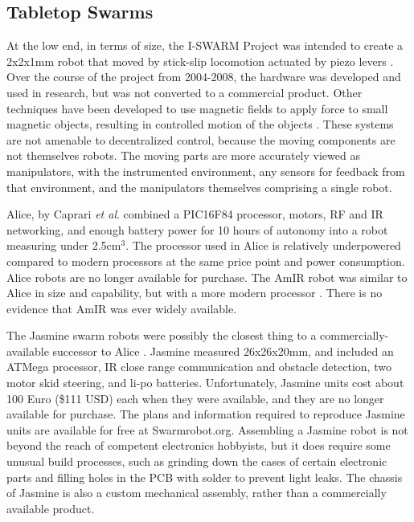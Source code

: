 \subsection{Tabletop Swarms}

At the low end, in terms of size, the I-SWARM Project was intended to create a 2x2x1mm robot that moved by stick-slip locomotion actuated by piezo levers \citep{seyfried2005swarm}. 
Over the course of the project from 2004-2008, the hardware was developed and used in research, but was not converted to a commercial product.
Other techniques have been developed to use magnetic fields to apply force to small magnetic objects, resulting in controlled motion of the objects \citep{floyd2008untethered, pelrine2012diamagnetically}.
These systems are not amenable to decentralized control, because the moving components are not themselves robots. 
The moving parts are more accurately viewed as manipulators, with the instrumented environment, any sensors for feedback from that environment, and the manipulators themselves comprising a single robot. 

Alice, by Caprari \emph{et al}. \citep{caprari1998autonomous} combined a PIC16F84 processor, motors, RF and IR networking, and enough battery power for 10 hours of autonomy into a robot measuring under 2.5cm$^3$. 
The processor used in Alice is relatively underpowered compared to modern processors at the same price point and power consumption. 
Alice robots are no longer available for purchase. 
The AmIR robot was similar to Alice in size and capability, but with a more modern processor \citep{arvin2009development}.
There is no evidence that AmIR was ever widely available.

The Jasmine swarm robots were possibly the closest thing to a commercially-available successor to Alice  \citep{kernbach2011swarmrobot}.
Jasmine measured 26x26x20mm, and included an ATMega processor, IR close range communication and obstacle detection, two motor skid steering, and li-po batteries.
Unfortunately, Jasmine units cost about 100 Euro (\$111 USD) each when they were available, and they are no longer available for purchase. 
The plans and information required to reproduce Jasmine units are available for free at Swarmrobot.org.
Assembling a Jasmine robot is not beyond the reach of competent electronics hobbyists, but it does require some unusual build processes, such as grinding down the cases of certain electronic parts and filling holes in the PCB with solder to prevent light leaks. 
The chassis of Jasmine is also a custom mechanical assembly, rather than a commercially available product. 

